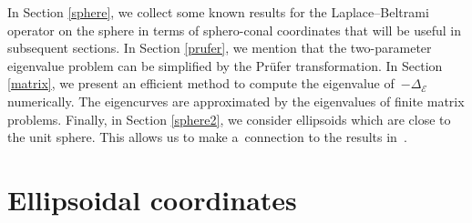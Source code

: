 \documentclass[pdftex]{sigma}
\newcommand{\E}{\mathcal{E}}
\newcommand{\D}{\Delta_\E}
\numberwithin{equation}{section}
\begin{document}
In Section \ref{sphere}, we collect some known results for the Laplace--Beltrami operator on the sphere
in terms of sphero-conal coordinates that will be useful in subsequent sections.
In Section \ref{prufer}, we mention that the two-parameter eigenvalue problem
can be simplified by the Pr\"ufer transformation.
In Section \ref{matrix}, we present an efficient method to compute the eigenvalue of~$-\D$ numerically.
The eigencurves are approximated by the eigenvalues of finite matrix problems.
Finally, in Section \ref{sphere2}, we consider ellipsoids which are close to the unit sphere.
This allows us to make a~connection to the results in~\cite{EK}.

\section{Ellipsoidal coordinates}\label{coords}
\end{document}
